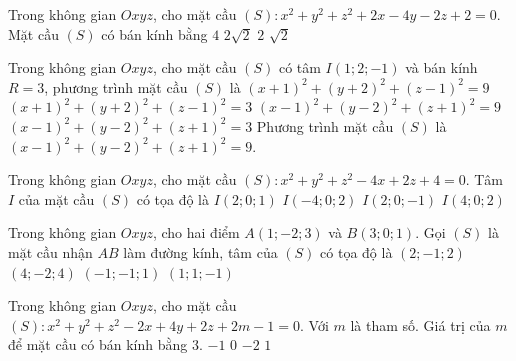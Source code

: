 \begin{vd}%
    Trong không gian $Oxyz$, cho mặt cầu $(S)\colon x^2+y^2+z^2+2x-4y-2z+2=0$. Mặt cầu $(S)$ có bán kính bằng
    \choice
    {$4$}
    {$2\sqrt{2}$}
    {\True $2$}
    {$\sqrt{2}$}
\end{vd}
\begin{vd}%
    Trong không gian $Oxyz$, cho mặt cầu $(S)$ có tâm $I(1;2;-1)$ và bán kính $R=3$, phương trình mặt cầu $(S)$ là
    \choice
    {$(x+1)^2+(y+2)^2+(z-1)^2=9$}
    {$(x+1)^2+(y+2)^2+(z-1)^2=3$}
    {\True $(x-1)^2+(y-2)^2+(z+1)^2=9$}
    {$(x-1)^2+(y-2)^2+(z+1)^2=3$}
    \loigiai
    {
        Phương trình mặt cầu $(S)$ là $(x-1)^2+(y-2)^2+(z+1)^2=9$.
    }
\end{vd}
\begin{vd}%
    Trong không gian $Oxyz$, cho mặt cầu $(S)\colon x^2 + y^2 + z^2 - 4x + 2z + 4 = 0$. Tâm $I$ của mặt cầu $(S)$ có tọa độ là
    \choice
    {$I(2; 0; 1)$}
    {$I(-4; 0; 2)$}
    {\True $I(2; 0; -1)$}
    {$I(4; 0; 2)$}	
\end{vd}
\begin{vd}[TN2024-102]%
    Trong không gian $Oxyz$, cho hai điểm $A(1;-2;3)$ và $B(3; 0; 1)$. Gọi $(S)$ là mặt cầu nhận $AB$ làm đường kính, tâm của $(S)$ có tọa độ là
    \choice
    {\True $(2;-1; 2)$}
    {$(4;-2; 4)$}
    {$(-1;-1; 1)$}
    {$(1; 1;-1)$}
\end{vd}
\begin{vd}%
    Trong không gian  $Oxyz$, cho mặt cầu $(S)\colon x^2+y^2+z^2-2x+4y+2z+2m-1=0$.
    Với $m$ là tham số. Giá trị của $m$ để mặt cầu có bán kính bằng $3$.
    \choice
    {\True $-1$}
    {$0$}
    {$-2$}
    {$1$}
\end{vd}
